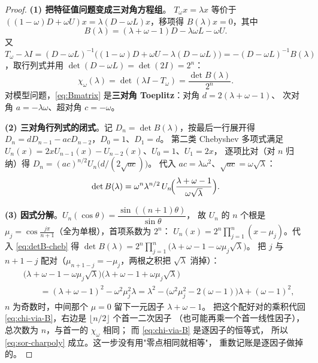 \begin{proof}
\textbf{(1) 把特征值问题变成三对角方程组}。
$T_\omega x=\lambda x$ 等价于 $((1-\omega)D+\omega U)x=\lambda(D-\omega L)x$，移项得
$B(\lambda)x=0$，其中
\begin{equation}
  B(\lambda)=(\lambda+\omega-1)D-\lambda\omega L-\omega U .
  \label{eq:Bmatrix}
\end{equation}
又 $T_\omega-\lambda I=(D-\omega L)^{-1}\bigl((1-\omega)D+\omega U-\lambda(D-\omega L)\bigr)
=-(D-\omega L)^{-1}B(\lambda)$，取行列式并用 $\det(D-\omega L)=\det(2I)=2^n$：
\begin{equation}
  \chi_\omega(\lambda)=\det(\lambda I-T_\omega)=\frac{\det B(\lambda)}{2^n}.
  \label{eq:chi-via-B}
\end{equation}
对模型问题，\eqref{eq:Bmatrix} 是\textbf{三对角 Toeplitz}：对角 $d=2(\lambda+\omega-1)$、
次对角 $a=-\lambda\omega$、超对角 $c=-\omega$。

\textbf{(2) 三对角行列式的闭式}。记 $D_n=\det B(\lambda)$，按最后一行展开得
$D_n=dD_{n-1}-acD_{n-2}$，$D_0=1$、$D_1=d$。
第二类 Chebyshev 多项式满足 $U_n(x)=2xU_{n-1}(x)-U_{n-2}(x)$、$U_0=1$、$U_1=2x$，
逐项比对（对 $n$ 归纳）得 $D_n=(ac)^{n/2}U_n\bigl(d/(2\sqrt{ac})\bigr)$。
代入 $ac=\lambda\omega^2$、$\sqrt{ac}=\omega\sqrt\lambda$：
\begin{equation}
  \det B(\lambda)=\omega^n\lambda^{n/2}\,U_n\!\Bigl(\frac{\lambda+\omega-1}{\omega\sqrt\lambda}\Bigr).
  \label{eq:detB-cheb}
\end{equation}

\textbf{(3) 因式分解}。$U_n(\cos\theta)=\dfrac{\sin((n+1)\theta)}{\sin\theta}$，
故 $U_n$ 的 $n$ 个根是 $\mu_j=\cos\frac{j\pi}{n+1}$（全为单根），首项系数为 $2^n$：
$U_n(x)=2^n\prod_{j=1}^n(x-\mu_j)$。代入 \eqref{eq:detB-cheb} 得
$\det B(\lambda)=2^n\prod_{j=1}^n\bigl(\lambda+\omega-1-\omega\mu_j\sqrt\lambda\bigr)$。
把 $j$ 与 $n+1-j$ 配对（$\mu_{n+1-j}=-\mu_j$，两根之积把 $\sqrt\lambda$ 消掉）：
\begin{equation}
  \begin{split}
    &\bigl(\lambda+\omega-1-\omega\mu_j\sqrt\lambda\bigr)
    \bigl(\lambda+\omega-1+\omega\mu_j\sqrt\lambda\bigr)\\
    &\qquad=(\lambda+\omega-1)^2-\omega^2\mu_j^2\lambda
    =\lambda^2-\bigl(\omega^2\mu_j^2-2(\omega-1)\bigr)\lambda+(\omega-1)^2 ,
  \end{split}
\end{equation}
$n$ 为奇数时，中间那个 $\mu=0$ 留下一元因子 $\lambda+\omega-1$。
把这个配好对的乘积代回 \eqref{eq:chi-via-B}，右边是 $\lfloor n/2\rfloor$ 个首一二次因子
（也可能再乘一个首一线性因子），总次数为 $n$，与首一的 $\chi_\omega$ 相同；
而 \eqref{eq:chi-via-B} 是逐因子的恒等式，
所以 \eqref{eq:sor-charpoly} 成立。这一步没有用"零点相同就相等"，
重数记账是逐因子做掉的。


\end{proof}
